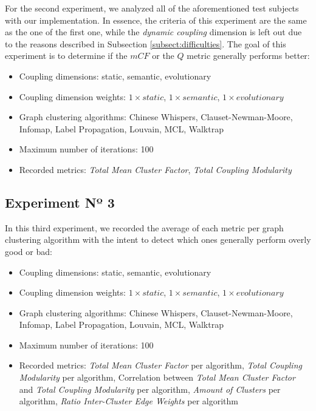 \documentclass[12pt,a4paper]{report}
\begin{document}
For the second experiment, we analyzed all of the
aforementioned test subjects with our implementation. In essence, the criteria
of this experiment are the same as the one of the first one, while the
\textit{dynamic coupling} dimension is left out due to the reasons described in
Subsection \ref{subsect:difficulties}. The goal of this experiment is to
determine if the $mCF$ or the $Q$ metric generally performs better:
\begin{itemize}[noitemsep]
    \item Coupling dimensions: static, semantic, evolutionary
    \item Coupling dimension weights: $1 \times static$, $1 \times semantic$, $1 \times evolutionary$
    \item Graph clustering algorithms: Chinese Whispers, Clauset-Newman-Moore, Infomap, Label Propagation, Louvain, MCL, Walktrap
    \item Maximum number of iterations: 100
    \item Recorded metrics:
    \textit{Total Mean Cluster Factor},
    \textit{Total Coupling Modularity}
\end{itemize}


\subsection{Experiment Nº 3}

In this third experiment, we recorded
the average of each metric per graph clustering algorithm with the intent to
detect which ones generally perform overly good or bad:
\begin{itemize}[noitemsep]
    \item Coupling dimensions: static, semantic, evolutionary
    \item Coupling dimension weights: $1 \times static$, $1 \times semantic$, $1 \times evolutionary$
    \item Graph clustering algorithms: Chinese Whispers, Clauset-Newman-Moore, Infomap, Label Propagation, Louvain, MCL, Walktrap
    \item Maximum number of iterations: 100
    \item Recorded metrics:
    \textit{Total Mean Cluster Factor} per algorithm,
    \textit{Total Coupling Modularity} per algorithm,
    Correlation between \textit{Total Mean Cluster Factor} and \textit{Total Coupling Modularity} per algorithm,
    \textit{Amount of Clusters} per algorithm,
    \textit{Ratio Inter-Cluster Edge Weights} per algorithm
\end{itemize}
\end{document}
